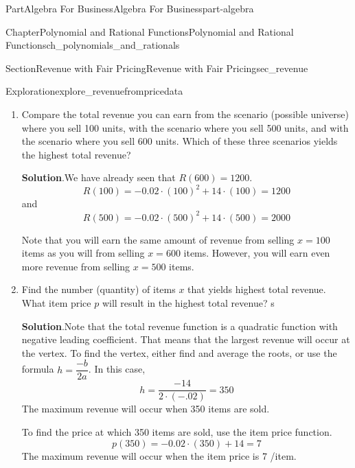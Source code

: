 \documentclass{tufte-book}
\newcommand{\blocktitlefont}{\relax}
\numberwithin{equation}{chapter}
\begin{document}
\begin{partptx}{Part}{Algebra For Business}{}{Algebra For Business}{}{}{part-algebra}
\begin{chapterptx}{Chapter}{Polynomial and Rational Functions}{}{Polynomial and Rational Functions}{}{}{ch_polynomials_and_rationals}
\begin{sectionptx}{Section}{Revenue with Fair Pricing}{}{Revenue with Fair Pricing}{}{}{sec_revenue}
\begin{exploration}{Exploration}{}{explore_revenuefrompricedata}
\begin{enumerate}[font=\bfseries,label=(\alph*),ref=\alph*]
\par
In this scenario, the total revenue will be \(600\) items times \(2\) dollars, which equals \textdollar{}\(1200\) of total revenue.%
\par
Equivalently, \(R(600) = -0.02\cdot (600)^2 + 14 \cdot (600) = \dots = 1200\) dollars.%
\item{}Compare the total revenue you can earn from the scenario (possible universe) where you sell 100 units, with the scenario where you sell 500 units, and with the scenario where you sell 600 units. Which of these three scenarios yields the highest total revenue?%
\par\smallskip%
\noindent\textbf{\blocktitlefont Solution}.\hypertarget{explore_revenuefrompricedata-5-2}{}\quad{}We have already seen that \(R(600) = 1200\).%
\begin{equation*}
R(100) = -0.02\cdot (100)^2 + 14 \cdot (100) = 1200
\end{equation*}
and%
\begin{equation*}
R(500) = -0.02\cdot (500)^2 + 14 \cdot (500) = 2000
\end{equation*}
%
\par
Note that you will earn the same amount of revenue from selling \(x=100\) items as you will from selling \(x=600\) items.  However, you will earn even more revenue from selling \(x=500\) items.%
\item{}Find the number (quantity) of items \(x\) that yields highest total revenue. What item price \(p\) will result in the highest total revenue? s%
\par\smallskip%
\noindent\textbf{\blocktitlefont Solution}.\hypertarget{explore_revenuefrompricedata-6-2}{}\quad{}Note that the total revenue function is a quadratic function with negative leading coefficient.  That means that the largest revenue will occur at the vertex.  To find the vertex, either find and average the roots, or use the formula \(h = \dfrac{-b}{2a}\).  In this case,%
\begin{equation*}
h = \dfrac{-14}{2\cdot(-.02)} = 350
\end{equation*}
The maximum revenue will occur when 350 items are sold.%
\par
To find the price at which 350 items are sold, use the item price function.%
\begin{equation*}
p(350) = -0.02\cdot (350) + 14 = 7 
\end{equation*}
The maximum revenue will occur when the item price is 7 \textdollar{}\slash{}item.%
\begin{equation*}

\end{equation*}
\end{enumerate}
\end{exploration}
\end{sectionptx}
\end{chapterptx}
\end{partptx}
\end{document}

